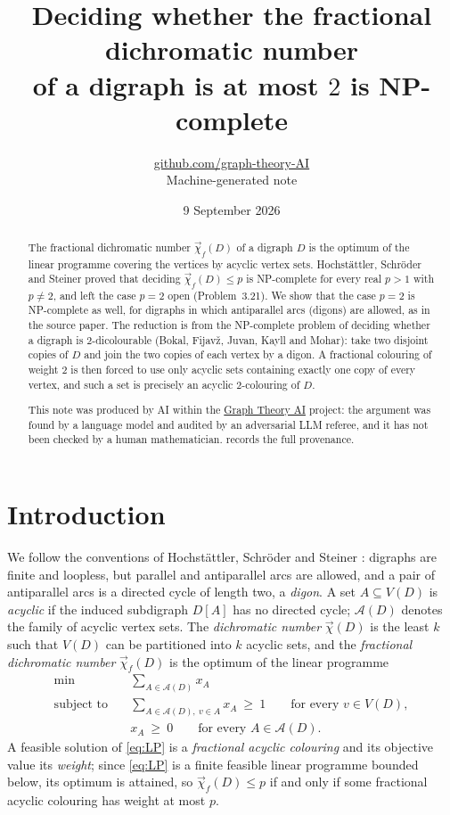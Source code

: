\documentclass[11pt,a4paper]{article}
\title{Deciding whether the fractional dichromatic number\\ of a digraph is at most $2$ is NP-complete}
\author{\href{https://github.com/graph-theory-AI}{github.com/graph-theory-AI}\\[2pt] \normalsize Machine-generated note}
\date{9 September 2026}
\theoremstyle{plain}
\theoremstyle{definition}
\theoremstyle{remark}
\newcommand{\fdc}{\vec{\chi}_{f}}
\newcommand{\dic}{\vec{\chi}}
\newcommand{\cA}{\mathcal A}
\begin{document}
\maketitle


\begin{abstract}
The fractional dichromatic number $\fdc(D)$ of a digraph $D$ is the optimum of the linear programme covering the vertices by acyclic vertex sets. Hochstättler, Schröder and Steiner proved that deciding $\fdc(D)\le p$ is NP-complete for every real $p>1$ with $p\ne2$, and left the case $p=2$ open (Problem~3.21). We show that the case $p=2$ is NP-complete as well, for digraphs in which antiparallel arcs (digons) are allowed, as in the source paper. The reduction is from the NP-complete problem of deciding whether a digraph is $2$-dicolourable (Bokal, Fijavž, Juvan, Kayll and Mohar): take two disjoint copies of $D$ and join the two copies of each vertex by a digon. A fractional colouring of weight $2$ is then forced to use only acyclic sets containing exactly one copy of every vertex, and such a set is precisely an acyclic $2$-colouring of $D$.

\medskip\noindent\small
This note was produced by AI within the \href{https://github.com/graph-theory-AI/Graph-Theory-LLM-Proofs}{Graph Theory AI} project:
the argument was found by a language model and audited by an adversarial LLM
referee, and it has not been checked by a human mathematician.
 records the full provenance.

\end{abstract}

\section{Introduction}\label{sec:intro}

We follow the conventions of Hochstättler, Schröder and Steiner \cite{HSS20}: digraphs are finite and loopless, but parallel and antiparallel arcs are allowed, and a pair of antiparallel arcs is a directed cycle of length two, a \emph{digon}. A set $A\subseteq V(D)$ is \emph{acyclic} if the induced subdigraph $D[A]$ has no directed cycle; $\cA(D)$ denotes the family of acyclic vertex sets. The \emph{dichromatic number} $\dic(D)$ is the least $k$ such that $V(D)$ can be partitioned into $k$ acyclic sets, and the \emph{fractional dichromatic number} $\fdc(D)$ is the optimum of the linear programme
\begin{equation}\label{eq:LP}
\begin{aligned}
\min\quad&\sum_{A\in\cA(D)}x_A\\
\text{subject to}\quad&\sum_{A\in\cA(D),\ v\in A}x_A\ \ge\ 1\qquad\text{for every }v\in V(D),\\
&x_A\ \ge\ 0\qquad\text{for every }A\in\cA(D).
\end{aligned}
\end{equation}
A feasible solution of \eqref{eq:LP} is a \emph{fractional acyclic colouring} and its objective value its \emph{weight}; since \eqref{eq:LP} is a finite feasible linear programme bounded below, its optimum is attained, so $\fdc(D)\le p$ if and only if some fractional acyclic colouring has weight at most $p$.
\end{document}

